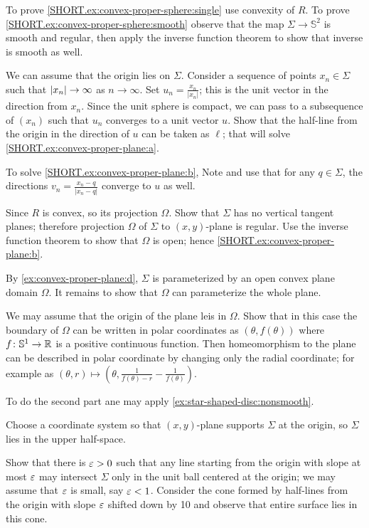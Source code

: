 To prove \ref{SHORT.ex:convex-proper-sphere:single} use convexity of $R$.
To prove \ref{SHORT.ex:convex-proper-sphere:smooth} observe that the map $\Sigma\to\mathbb{S}^2$ is smooth and regular, then apply the inverse function theorem to show that inverse is smooth as well.



We can assume that the origin lies on $\Sigma$.
Consider a sequence of points $x_n\in \Sigma$ such that $|x_n|\z\to \infty$ as $n\to \infty$.
Set $u_n=\tfrac{x_n}{|x_n|}$; this is the unit vector in the direction from $x_n$.
Since the unit sphere is compact, we can pass to a subsequence of $(x_n)$ such that $u_n$ converges to a unit vector $u$.
Show that the half-line from the origin in the direction of $u$ can be taken as $\ell$; that will solve \ref{SHORT.ex:convex-proper-plane:a}.

To solve \ref{SHORT.ex:convex-proper-plane:b},
Note and use that for any $q\in \Sigma$, the directions $v_n=\tfrac{x_n-q}{|x_n-q|}$ converge to $u$ as well.

Since $R$ is convex, so its projection $\Omega$.
Show that $\Sigma$ has no vertical tangent planes;
therefore projection $\Omega$ of $\Sigma$ to $(x,y)$-plane is regular.
Use the inverse function theorem to show that $\Omega$ is open; hence \ref{SHORT.ex:convex-proper-plane:b}.

By \ref{ex:convex-proper-plane:d}, $\Sigma$ is parameterized by an open convex plane domain $\Omega$.
It remains to show that $\Omega$ can parameterize the whole plane.

We may assume that the origin of the plane leis in $\Omega$.
Show that in this case the boundary of $\Omega$ can be written in polar coordinates as $(\theta,f(\theta))$ where $f\colon\mathbb{S}^1\to\mathbb{R}$ is a positive continuous function.
Then homeomorphism to the plane can be described in polar coordinate by changing only the radial coordinate;
for example as 
$(\theta,r)\mapsto (\theta,
\tfrac1{f(\theta)-r}-\tfrac1{f(\theta)})$.

To do the second part ane may apply \ref{ex:star-shaped-disc:nonsmooth}.


Choose a coordinate system so that $(x,y)$-plane supports $\Sigma$ at the origin, so $\Sigma$ lies in the upper half-space.

Show that there is $\varepsilon>0$ such that any line starting from the origin with slope at most $\varepsilon$ may intersect $\Sigma$ only in the unit ball centered at the origin;
we may assume that $\varepsilon$ is small, say $\varepsilon<1$.
Consider the cone formed by half-lines from the origin with slope $\varepsilon$ shifted down by 10 and observe that entire surface lies in this cone.




